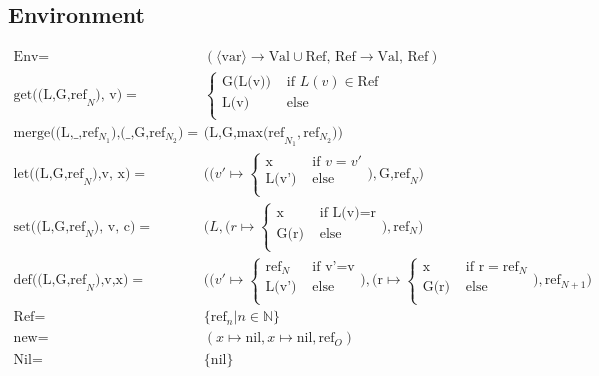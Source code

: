 \documentclass{article}
\begin{document}
\subsection{Environment}
$
\begin{array}{rl}
\text{Env} = & (\langle \text{var} \rangle \to \text{Val} \cup \text{Ref, Ref} \to \text{Val, Ref}) \\
\text{get((L,G,ref}_N\text{), v)} =   & \begin{cases} \text{G(L(v))} & \text{ if } L(v)\in \text{Ref} \\
                    \text{L(v)} & \text{ else } \\ \end{cases}\\
\text{merge((L,\_,}\text{ref}_{N_1}\text{),(\_,G,}\text{ref}_{N_2}\text{)} = & \text{(L,G,max(ref}_{N_1},\text{ref}_{N_2})) \\
\text{let((L,G,ref}_N\text{),v, x)} =& \Big(\Big( v'\mapsto 
\begin{cases}
\text{x} & \text{ if } v=v'\\
\text{L(v')} & \text{ else} \\
\end{cases}\Big), \text{G,ref}_N\Big)\\
\text{set((L,G,ref}_N\text{), v, c)} =& \Big(L,\Big(r \mapsto 
\begin{cases}
\text{x} & \text{ if } \text{L(v)} = \text{r} \\
\text{G(r)} & \text{ else } \\
\end{cases}\Big),\text{ref}_N\Big)\\
\text{def((L,G,ref}_N\text{),v,x)} = & \Big(\Big(v' \mapsto 
\begin{cases}
\text{ref}_N & \text{ if } \text{v'=v} \\
\text{L(v')} & \text{ else} \\
\end{cases} \Big),\Big( \text{r}\mapsto
\begin{cases}
\text{x} & \text{ if } \text{r}=\text{ref}_N\\
\text{G(r)} & \text{ else} \\
\end{cases}\Big), \text{ref}_{N+1}\Big) \\
\text{Ref} = & \{\text{ref}_n | n\in \mathbb{N}\} \\
\text{new} = & ( x\mapsto \text{nil}, x\mapsto \text{nil}, \text{ref}_O) \\
\text{Nil} = & \{\text{nil}\} \\
\end{array}
$
\end{document}
